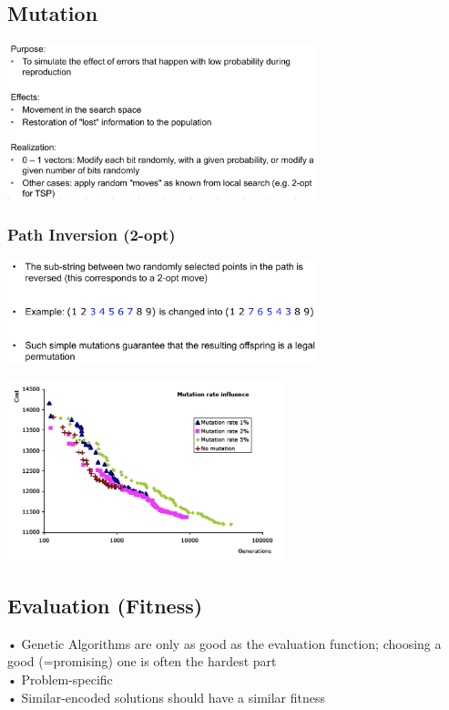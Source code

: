 \documentclass[10pt,a4paper,twocolumn]{article}
\begin{document}
\subsection{Mutation}

\begin{center}
	\includegraphics[width=9cm]{images/mutation-purpose}
\end{center}

\subsubsection{Path Inversion (2-opt)}

\begin{center}
	\includegraphics[width=9cm]{images/2-opt}
\end{center}

\begin{center}
	\includegraphics[width=8cm]{images/pressure-mutation}
\end{center}

\subsection{Evaluation (Fitness)}
• Genetic Algorithms are only as good as the evaluation function; choosing a good (=promising) one is often the hardest part\\
• Problem-specific\\
• Similar-encoded solutions should have a similar fitness\\
\end{document}
